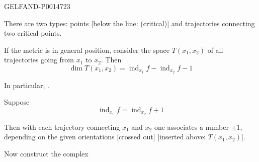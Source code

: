 \begin{GelfandAdjacentEvidence}{GELFAND-P001472}{3}


There are two types: points [below the line: (critical)] and trajectories connecting two critical points.

If the metric is in general position, consider the space \(T(x_1,x_2)\) of all trajectories going from \(x_1\) to \(x_2\). Then
\begin{equation*}
\dim T(x_1,x_2)=\operatorname{ind}_{x_1}f-\operatorname{ind}_{x_2}f-1
\tag{1}
\end{equation*}

In particular, .

Suppose
\begin{equation*}
\operatorname{ind}_{x_1}f=\operatorname{ind}_{x_2}f+1
\tag{2}
\end{equation*}

Then with each trajectory connecting \(x_1\) and \(x_2\) one associates a number \(\pm1\), depending on the given orientations [crossed out] [inserted above: \(T(x_1,x_2)\)].
\end{GelfandAdjacentEvidence}


Now construct the complex


